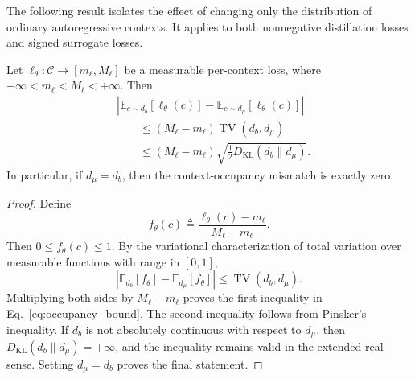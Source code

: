 The following result isolates the effect of changing only the distribution
of ordinary autoregressive contexts. It applies to both nonnegative
distillation losses and signed surrogate losses.

\begin{proposition}
\label{prop:occupancy_matching}
Let
\(\ell_\theta:\mathcal C\rightarrow[m_\ell,M_\ell]\)
be a measurable per-context loss, where
\(-\infty<m_\ell<M_\ell<+\infty\). Then
\begin{equation}
\begin{aligned}
 &
 \left|
   \mathbb E_{c\sim d_b}
   \left[
     \ell_\theta(c)
   \right]
   -
   \mathbb E_{c\sim d_\mu}
   \left[
     \ell_\theta(c)
   \right]
 \right|
 \\
 &\qquad\le
 \left(
   M_\ell-m_\ell
 \right)
 \operatorname{TV}(d_b,d_\mu)
 \\
 &\qquad\le
 \left(
   M_\ell-m_\ell
 \right)
 \sqrt{
   \frac{1}{2}
   D_{\mathrm{KL}}(d_b\|d_\mu)
 }.
\end{aligned}
\label{eq:occupancy_bound}
\end{equation}
In particular, if \(d_\mu=d_b\), then the context-occupancy mismatch is
exactly zero.
\end{proposition}

\begin{proof}
Define
\begin{equation*}
 f_\theta(c)
 \triangleq
 \frac{
   \ell_\theta(c)-m_\ell
 }{
   M_\ell-m_\ell
 }.
\end{equation*}
Then \(0\le f_\theta(c)\le 1\). By the variational characterization of
total variation over measurable functions with range in \([0,1]\),
\begin{equation*}
 \left|
   \mathbb E_{d_b}[f_\theta]
   -
   \mathbb E_{d_\mu}[f_\theta]
 \right|
 \le
 \operatorname{TV}(d_b,d_\mu).
\end{equation*}
Multiplying both sides by \(M_\ell-m_\ell\) proves the first inequality in
Eq.~\ref{eq:occupancy_bound}. The second inequality follows from
Pinsker's inequality. If \(d_b\) is not absolutely continuous with respect
to \(d_\mu\), then
\(D_{\mathrm{KL}}(d_b\|d_\mu)=+\infty\), and the inequality remains valid
in the extended-real sense. Setting \(d_\mu=d_b\) proves the final
statement.
\end{proof}

